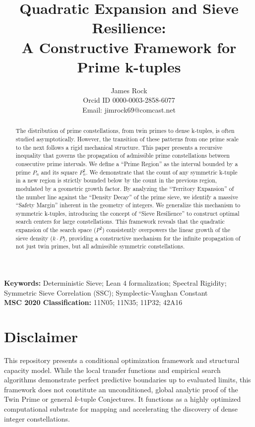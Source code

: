 \documentclass[sn-mathphys-num, pdflatex]{sn-jnl}
\title{Quadratic Expansion and Sieve Resilience: \\ \Large A Constructive Framework for Prime k-tuples}
\author{\begin{center} James Rock \\ Orcid ID 0000-0003-2858-6077 \\ Email: jimrock69@comcast.net \end{center}}
\date{}
\begin{document}
\maketitle

\begin{abstract}
{}The distribution of prime constellations, from twin primes to dense k-tuples, is often studied asymptotically. However, the transition of these patterns from one prime scale to the next follows a rigid mechanical structure. This paper presents a recursive inequality that governs the propagation of admissible prime constellations between consecutive prime intervals. We define a ``Prime Region'' as the interval bounded by a prime $P_{n}$ and its square $P_{n}^{2}$. We demonstrate that the count of any symmetric k-tuple in a new region is strictly bounded below by the count in the previous region, modulated by a geometric growth factor. By analyzing the ``Territory Expansion'' of the number line against the ``Density Decay'' of the prime sieve, we identify a massive ``Safety Margin'' inherent in the geometry of integers. We generalize this mechanism to symmetric k-tuples, introducing the concept of ``Sieve Resilience'' to construct optimal search centers for large constellations. This framework reveals that the quadratic expansion of the search space ($P^2$) consistently overpowers the linear growth of the sieve density ($k \cdot P$), providing a constructive mechanism for the infinite propagation of not just twin primes, but all admissible symmetric constellations.
\end{abstract}

\noindent \textbf{Keywords:} Deterministic Sieve; Lean 4 formalization; Spectral Rigidity; Symmetric Sieve Correlation (SSC);  Symplectic-Vaughan Constant \\
\noindent \textbf{MSC 2020 Classification:} 11N05; 11N35; 11P32; 42A16

\section{Disclaimer}
This repository presents a conditional optimization framework and structural capacity model. While the local transfer functions and empirical search algorithms demonstrate perfect predictive boundaries up to evaluated limits, this framework does not constitute an unconditioned, global analytic proof of the Twin Prime or general $k$-tuple Conjectures. It functions as a highly optimized computational substrate for mapping and accelerating the discovery of dense integer constellations.
\end{document}
